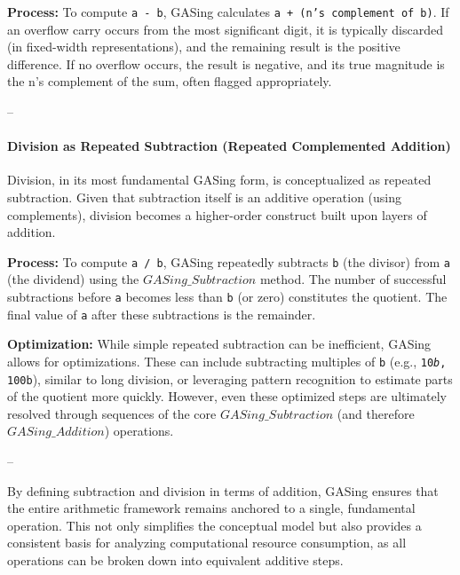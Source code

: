 \noindent\textbf{\textbf{Process:} } To compute \texttt{a - b}, GASing calculates \texttt{a + (n's complement of b)}. If an overflow carry occurs from the most significant digit, it is typically discarded (in fixed-width representations), and the remaining result is the positive difference. If no overflow occurs, the result is negative, and its true magnitude is the n's complement of the sum, often flagged appropriately.





\noindent --

\paragraph{Division as Repeated Subtraction (Repeated Complemented Addition)}

Division, in its most fundamental GASing form, is conceptualized as repeated subtraction. Given that subtraction itself is an additive operation (using complements), division becomes a higher-order construct built upon layers of addition.


\noindent\textbf{\textbf{Process:} } To compute \texttt{a / b}, GASing repeatedly subtracts \texttt{b} (the divisor) from \texttt{a} (the dividend) using the \texttt{$GASing\_{Subtraction}$} method. The number of successful subtractions before \texttt{a} becomes less than \texttt{b} (or zero) constitutes the quotient. The final value of \texttt{a} after these subtractions is the remainder.


\noindent\textbf{\textbf{Optimization:} } While simple repeated subtraction can be inefficient, GASing allows for optimizations. These can include subtracting multiples of \texttt{b} (e.g., \texttt{10\emph{b}, \texttt{100}b}), similar to long division, or leveraging pattern recognition to estimate parts of the quotient more quickly. However, even these optimized steps are ultimately resolved through sequences of the core \texttt{$GASing\_{Subtraction}$} (and therefore \texttt{$GASing\_{Addition}$}) operations.



\noindent --


By defining subtraction and division in terms of addition, GASing ensures that the entire arithmetic framework remains anchored to a single, fundamental operation. This not only simplifies the conceptual model but also provides a consistent basis for analyzing computational resource consumption, as all operations can be broken down into equivalent additive steps.

